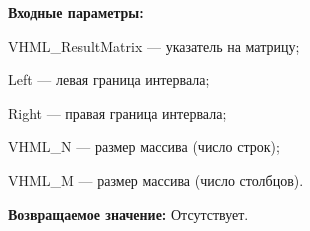 \textbf{Входные параметры:}

 VHML\_ResultMatrix --- указатель на матрицу;
 
 Left --- левая граница интервала;
 
 Right --- правая граница интервала;
 
 VHML\_N --- размер массива (число строк);
 
 VHML\_M --- размер массива (число столбцов).

\textbf{Возвращаемое значение:}
Отсутствует.